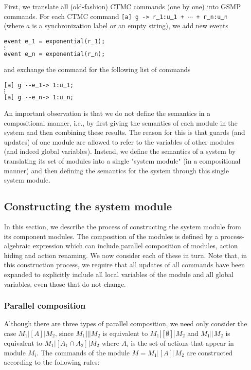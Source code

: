 \documentclass{article}
\renewcommand{\_}{\underline{~}}
\newcommand{\code}[1]{\texttt{#1}}
\begin{document}
First, we translate all (old-fashion) CTMC commands (one by one) into GSMP commands.
For each CTMC command \code{[a] g -> r\_1:u\_1 + $\cdots$ + r\_n:u\_n} (where $a$ is a synchronization label or an empty string), we add 
new events 
\begin{center}
	\code{event e\_1 = exponential(r\_1);} \\
	$\vdots$ \\
	\code{event e\_n = exponential(r\_n);}
\end{center}
and exchange the command for the following list of commands
\begin{center}
	\code{[a] g {-}{-}e\_1-> 1:u\_1;} \\
	$\vdots$ \\
	\code{[a] g {-}{-}e\_n-> 1:u\_n;} 
\end{center}

An important observation is that we do not define the semantics in a compositional manner, i.e., by first giving the semantics of each module in the system and then combining these results. 
The reason for this is that guards (and updates) of one module are allowed to refer to the variables of other modules (and indeed global variables). 
Instead, we define the semantics of a system by translating its set of modules into a single "system module" (in a compositional manner) and then defining the semantics for the system through this single system module.


\subsection*{Constructing the system module}
In this section, we describe the process of constructing the system module from its component modules. 
The composition of the modules is defined by a process-algebraic expression which can include parallel composition of modules, action hiding and action renaming. 
We now consider each of these in turn. Note that, in this construction process, we require that all updates of all commands have been expanded to explicitly include all local variables of the module and all global variables, even those that do not change.


\subsubsection*{Parallel composition}
Although there are three types of parallel composition, we need only consider the case
$M_1|[A]|M_2$, since $M_1|||M_2$ is equivalent to $M_1|[\emptyset]|M_2$ and $M_1||M_2$ is equivalent to $M_1|[A_1 \cap A_2]|M_2$ where $A_i$ is the set of actions that appear in module $M_i$. 
The commands of the module $M = M_1|[A]|M_2$ are constructed according to the following rules:
\end{document}
